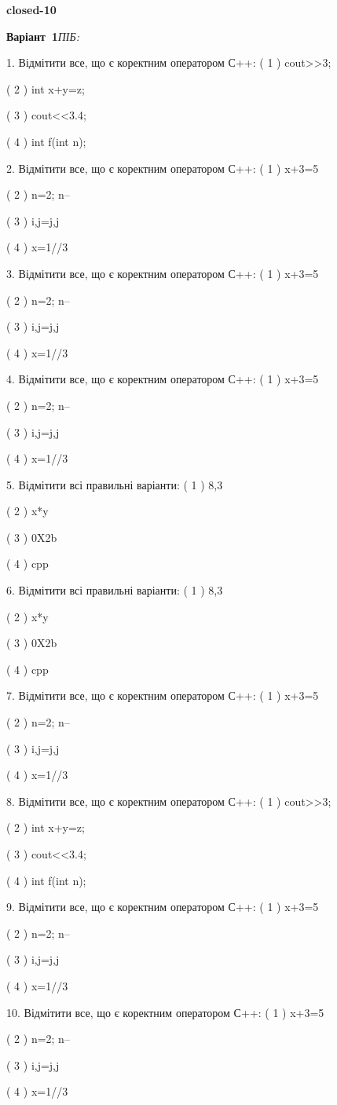 \documentclass[11pt]{article}
\begin{document}
{\large\textbf{closed-10}}

\textbf{Варіант \No\,1}\hfill \textit{ПІБ:}\,\underline{\hspace{60mm}}
\vspace{4mm}

1. Відмітити все, що є коректним оператором С++:
( 1 ) cout>>3;

( 2 ) int x+y=z;

( 3 ) cout<<3.4;

( 4 ) int f(int n);

2. Відмітити все, що є коректним оператором С++:
( 1 ) x+3=5

( 2 ) n=2; n--

( 3 ) i,j=j,j

( 4 ) x=1//3

3. Відмітити все, що є коректним оператором С++:
( 1 ) x+3=5

( 2 ) n=2; n--

( 3 ) i,j=j,j

( 4 ) x=1//3

4. Відмітити все, що є коректним оператором С++:
( 1 ) x+3=5

( 2 ) n=2; n--

( 3 ) i,j=j,j

( 4 ) x=1//3

5. Відмітити всі правильні варіанти:
( 1 ) 8,3

( 2 ) x*y

( 3 ) 0X2b

( 4 ) cpp

6. Відмітити всі правильні варіанти:
( 1 ) 8,3

( 2 ) x*y

( 3 ) 0X2b

( 4 ) cpp

7. Відмітити все, що є коректним оператором С++:
( 1 ) x+3=5

( 2 ) n=2; n--

( 3 ) i,j=j,j

( 4 ) x=1//3

8. Відмітити все, що є коректним оператором С++:
( 1 ) cout>>3;

( 2 ) int x+y=z;

( 3 ) cout<<3.4;

( 4 ) int f(int n);

9. Відмітити все, що є коректним оператором С++:
( 1 ) x+3=5

( 2 ) n=2; n--

( 3 ) i,j=j,j

( 4 ) x=1//3

10. Відмітити все, що є коректним оператором С++:
( 1 ) x+3=5

( 2 ) n=2; n--

( 3 ) i,j=j,j

( 4 ) x=1//3











\newpage
\end{document}

